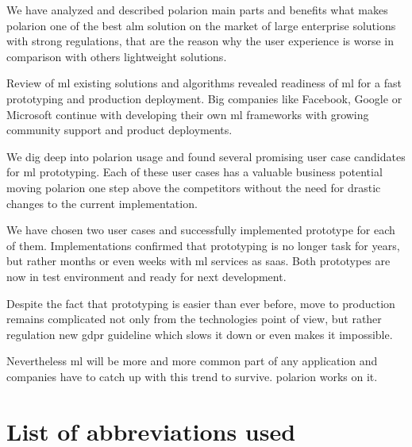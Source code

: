 \documentclass[thesis=M,english]{FITthesis}[2012/06/26]
\begin{document}
\begin{conclusion}
	
We have analyzed and described \acrshort{polarion} main parts and benefits what makes \acrshort{polarion} one of the best \acrshort{alm} solution on the market of large enterprise solutions with strong regulations, that are the reason why the user experience is worse in comparison with others lightweight solutions. 

Review of \acrshort{ml} existing solutions and algorithms revealed readiness of \acrshort{ml} for a fast prototyping and production deployment. Big companies like Facebook, Google or Microsoft continue with developing their own \acrshort{ml} frameworks with growing community support and product deployments.

We dig deep into \acrshort{polarion} usage and found several promising user case candidates for \acrshort{ml} prototyping. Each of these user cases has a valuable business potential moving \acrshort{polarion} one step above the competitors without the need for drastic changes to the current implementation.

We have chosen two user cases and successfully implemented prototype for each of them. Implementations confirmed that prototyping is no longer task for years, but rather months or even weeks with \acrshort{ml} services as \acrshort{saas}. Both prototypes are now in test environment and ready for next development.  

Despite the fact that prototyping is easier than ever before, move to production remains complicated not only from the technologies point of view, but rather regulation new \acrshort{gdpr} guideline which slows it down or even makes it impossible.

Nevertheless \acrshort{ml} will be more and more common part of any application and companies have to catch up with this trend to survive. \acrshort{polarion} works on it.   

\end{conclusion}




\appendix

\chapter{List of abbreviations used}

\printglossaries
\end{document}
